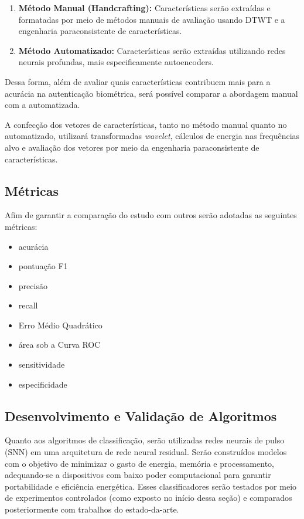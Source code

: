 			\begin{enumerate}
				\item \textbf{Método Manual (Handcrafting):} Características serão extraídas e formatadas por meio de métodos manuais de avaliação usando DTWT e a engenharia paraconsistente de características.
				\item \textbf{Método Automatizado:} Características serão extraídas utilizando redes neurais profundas, mais especificamente autoencoders.
			\end{enumerate}
			
			\par Dessa forma, além de avaliar quais características contribuem mais para a acurácia na autenticação biométrica, será possível comparar a abordagem manual com a automatizada.
			
			\par A confecção dos vetores de características, tanto no método manual quanto no automatizado, utilizará transformadas \textit{wavelet}, cálculos de energia nas frequências alvo e avaliação dos vetores por meio da engenharia paraconsistente de características.
			
		\subsection{Métricas}
		
			\par Afim de garantir a comparação do estudo com outros serão adotadas as seguintes métricas:
			
			\begin{itemize}
				\item acurácia
				\item pontuação F1
				\item precisão
				\item recall
				\item Erro Médio Quadrático
				\item área sob a Curva ROC
				\item sensitividade
				\item especificidade
			\end{itemize}
			
		\subsection{Desenvolvimento e Validação de Algoritmos}
		
			\par Quanto aos algoritmos de classificação, serão utilizadas redes neurais de pulso (SNN) em uma arquitetura de rede neural residual. Serão construídos modelos com o objetivo de minimizar o gasto de energia, memória e processamento, adequando-se a dispositivos com baixo poder computacional para garantir portabilidade e eficiência energética. Esses classificadores serão testados por meio de experimentos controlados (como exposto no início dessa seção) e comparados posteriormente com trabalhos do estado-da-arte.
			
